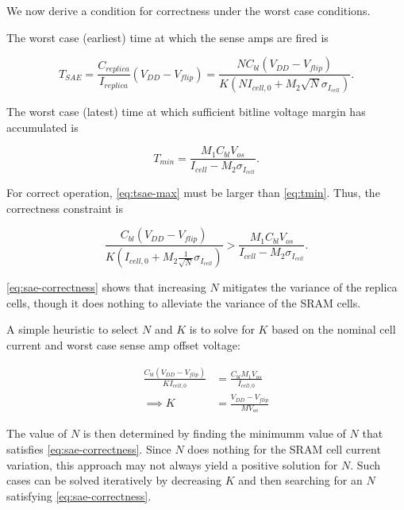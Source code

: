 We now derive a condition for correctness under the worst case conditions.

The worst case (earliest) time at which the sense amps are fired is

\begin{equation} \label{eq:tsae-max}
T_{SAE} = \frac{C_{replica}}{I_{replica}} \left( V_{DD} - V_{flip} \right)
= \frac{ N C_{bl}  \left(V_{DD} - V_{flip} \right) }{ K \left( N I_{cell,0} + M_2 \sqrt{N} \sigma_{I_{cell}} \right)}.
\end{equation}

The worst case (latest) time at which sufficient bitline voltage margin has accumulated is

\begin{equation} \label{eq:tmin}
T_{min} = \frac{M_1 C_{bl} V_{os}}{I_{cell} - M_2 \sigma_{I_{cell}}}.
\end{equation}

For correct operation, \ref{eq:tsae-max} must be larger than \ref{eq:tmin}. Thus, the correctness constraint is

\begin{equation} \label{eq:sae-correctness}
\frac{C_{bl}  \left( V_{DD} - V_{flip}\right)}{K \left( I_{cell,0} + M_2 \frac{1}{\sqrt{N}} \sigma_{I_{cell}} \right)} >
\frac{M_1 C_{bl} V_{os}}{I_{cell} - M_2 \sigma_{I_{cell}}}.
\end{equation}

\ref{eq:sae-correctness} shows that increasing $N$ mitigates the variance of the replica cells,
though it does nothing to alleviate the variance of the SRAM cells.

A simple heuristic to select $N$ and $K$ is to solve for $K$ based on the nominal cell current and worst case
sense amp offset voltage:

\begin{align} \label{eq:k-heuristic}
\frac{C_{bl} \left( V_{DD} - V_{flip} \right) }{K I_{cell,0}}
&= \frac{C_{bl} M_1 V_{os}}{I_{cell,0}} \\
\implies K &= \frac{V_{DD} - V_{flip}}{M V_{os}}
\end{align}

The value of $N$ is then determined by finding the minimumm value of $N$ that satisfies \ref{eq:sae-correctness}.
Since $N$ does nothing for the SRAM cell current variation, this approach may not always yield a positive solution for $N$.
Such cases can be solved iteratively by decreasing $K$ and then searching for an $N$ satisfying \ref{eq:sae-correctness}.

